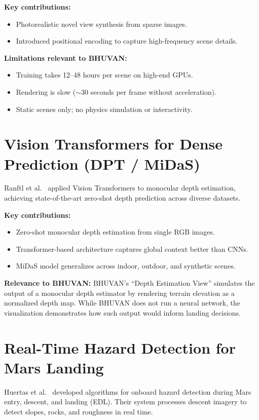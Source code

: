 \textbf{Key contributions:}
\begin{itemize}
    \item Photorealistic novel view synthesis from sparse images.
    \item Introduced positional encoding to capture high-frequency scene details.
\end{itemize}

\textbf{Limitations relevant to BHUVAN:}
\begin{itemize}
    \item Training takes 12--48 hours per scene on high-end GPUs.
    \item Rendering is slow ($\sim$30 seconds per frame without acceleration).
    \item Static scenes only; no physics simulation or interactivity.
\end{itemize}

\section{Vision Transformers for Dense Prediction (DPT / MiDaS)}
Ranftl et al.\ \cite{ranftl2021dpt} applied Vision Transformers to monocular depth estimation, achieving state-of-the-art zero-shot depth prediction across diverse datasets.

\textbf{Key contributions:}
\begin{itemize}
    \item Zero-shot monocular depth estimation from single RGB images.
    \item Transformer-based architecture captures global context better than CNNs.
    \item MiDaS model generalizes across indoor, outdoor, and synthetic scenes.
\end{itemize}

\textbf{Relevance to BHUVAN:}
BHUVAN's ``Depth Estimation View'' simulates the output of a monocular depth estimator by rendering terrain elevation as a normalized depth map. While BHUVAN does not run a neural network, the visualization demonstrates how such output would inform landing decisions.

\section{Real-Time Hazard Detection for Mars Landing}
Huertas et al.\ \cite{huertas2006hazard} developed algorithms for onboard hazard detection during Mars entry, descent, and landing (EDL). Their system processes descent imagery to detect slopes, rocks, and roughness in real time.

